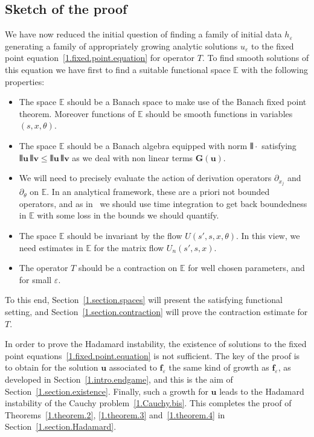 \documentclass[10pt]{amsart}
\theoremstyle{definition}
\theoremstyle{plain}
\newcommand*\e{\varepsilon}
\newcommand{\dptl}{\partial}%
\newcommand*\EE{{\mathbb E}}
\newcommand{\ubf}{{\mathbf u}}
\newcommand{\vbf}{{\mathbf v}}
\newcommand*\f{{\mathbf f}}
\DeclarePairedDelimiter{\VERT}{|\mkern -1.6mu|\mkern -1.6mu|}{|\mkern -1.6mu|\mkern -1.6mu|}
\begin{document}
\subsection{Sketch of the proof}\label{1.subsection.sketch}

We have now reduced the initial question of finding a family of initial data $h_{\e}$ generating a family of appropriately growing analytic solutions $u_{\e}$ to the fixed point equation~\eqref{1.fixed.point.equation} for operator $T$. To find smooth solutions of this equation we have first to find a suitable functional space $\EE$ with the following properties:
\begin{itemize}

\item The space $\EE$ should be a Banach space to make use of the Banach fixed point theorem. Moreover functions of $\EE$ should be smooth functions in variables $(s,x,\theta)$.

\item The space $\EE$ should be a Banach algebra equipped with norm $\VERT{\cdot}$ satisfying $ \VERT{\ubf}\, \VERT{\vbf} \leq \VERT{\ubf}\,\VERT{\vbf} $ as we deal with non linear terms ${\mathbf G}(\ubf)$.

\item We will need to precisely evaluate the action of derivation operators $\dptl_{x_j}$ and $\dptl_{\theta}$ on $\EE$. In an analytical framework, these are a priori not bounded operators, and as in~\cite{metivier2005remarks,ukai2001boltzmann} we should use time integration to get back boundedness in $\EE$ with some loss in the bounds we should quantify.

\item The space $\EE$ should be invariant by the flow $U(s',s,x,\theta)$. In this view, we need estimates in $\EE$ for the matrix flow $U_n(s',s,x)$.

\item The operator $T$ should be a contraction on $\EE$ for well chosen parameters, and for small $\e$.
\end{itemize}

\noindent To this end, Section~\ref{1.section.spaces} will present the satisfying functional setting, and Section~\ref{1.section.contraction} will prove the contraction estimate for $T$.

In order to prove the Hadamard instability, the existence of solutions to the fixed point equations~\eqref{1.fixed.point.equation} is not sufficient. The key of the proof is to obtain for the solution $\ubf$ associated to $\f_{\e}$ the same kind of growth as $\f_{\e}$, as developed in Section~\ref{1.intro.endgame}, and this is the aim of Section~\ref{1.section.existence}. Finally, such a growth for $\ubf$ leads to the Hadamard instability of the Cauchy problem~\eqref{1.Cauchy.bis}. This completes the proof of Theorems~\ref{1.theorem.2}, \ref{1.theorem.3} and~\ref{1.theorem.4} in Section~\ref{1.section.Hadamard}.
\end{document}
